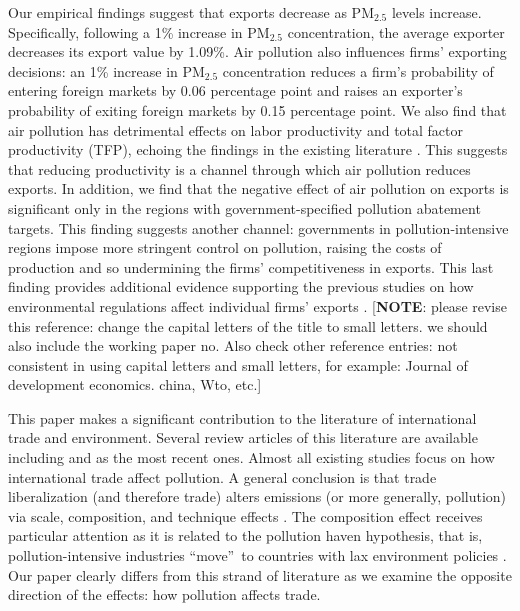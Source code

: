 \documentclass[12pt]{article}
\begin{document}
Our empirical findings suggest that exports decrease as $\mathrm{PM_{2.5}}$
levels increase. Specifically, following a 1\% increase in $\mathrm{PM_{2.5}}
$ concentration, the average exporter decreases its export value by 1.09\%.
Air pollution also influences firms' exporting decisions: an 1\% increase in 
$\mathrm{PM_{2.5}}$ concentration reduces a firm's probability of entering
foreign markets by 0.06 percentage point and raises an exporter's
probability of exiting foreign markets by 0.15 percentage point. We also
find that air pollution has detrimental effects on labor productivity and
total factor productivity (TFP), echoing the findings in the existing
literature \citep{NBERw18392,fu2021air,NBERw28401}.
This suggests that reducing productivity is a channel through which air
pollution reduces exports. In addition, we find that the negative effect of
air pollution on exports is significant only in the regions with
government-specified pollution abatement targets. This finding suggests
another channel: governments in pollution-intensive regions impose more
stringent control on pollution, raising the costs of production and so
undermining the firms' competitiveness in exports. This last finding
provides additional evidence supporting the previous studies on how
environmental regulations affect individual firms' exports %
\citep{cherniwchan2022environmental}. [\textbf{NOTE}: please revise this
reference: change the capital letters of the title to small letters. we
should also include the working paper no. Also check other reference
entries: not consistent in using capital letters and small letters, for
example: Journal of development economics. china, Wto, etc.]

This paper makes a significant contribution to the literature of
international trade and environment. Several review articles of this
literature are available including \cite{cherniwchan2017trade} and \cite%
{NBERw30020} as the most recent ones. Almost all existing
studies focus on how international trade affect pollution. A general
conclusion is that trade liberalization (and therefore trade) alters
emissions (or more generally, pollution) via scale, composition, and
technique effects \citep{NBERw3914,copeland1994north}.
The composition effect receives particular attention as it is related to the
pollution haven hypothesis, that is, pollution-intensive industries
\textquotedblleft move\textquotedblright\ to countries with lax
environment policies \citep{copeland1994north,taylor2005unbundling}. Our
paper clearly differs from this strand of literature as we examine the
opposite direction of the effects: how pollution affects trade.
\end{document}

